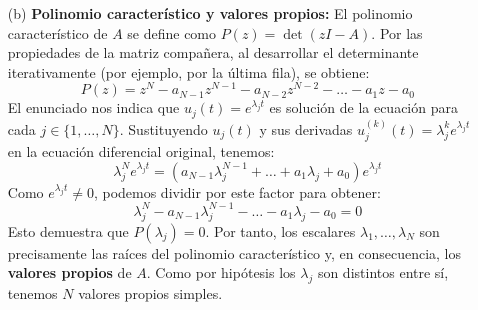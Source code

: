 {\begin{enumerate}
        $$U'(t) = \begin{pmatrix} 
            0 & 1 & 0 & \dots & 0 \\ 
            0 & 0 & 1 & \dots & 0 \\ 
            \vdots & \vdots & \vdots & \ddots & \vdots \\ 
            0 & 0 & 0 & \dots & 1 \\ 
            a_0 & a_1 & a_2 & \dots & a_{N-1} 
        \end{pmatrix} \begin{pmatrix} u(t) \\ u'(t) \\ \vdots \\ u^{(N-2)}(t) \\ u^{(N-1)}(t) \end{pmatrix}$$
        La matriz $A \in \mathcal{M}_N(\mathbb{C})$ obtenida recibe el nombre de \textit{matriz compañera} (o matriz acompañante) asociada a la ecuación diferencial.

        \item[(b)] \textbf{Polinomio característico y valores propios:}
        El polinomio característico de $A$ se define como $P(z) = \det(zI - A)$. Por las propiedades de la matriz compañera, al desarrollar el determinante iterativamente (por ejemplo, por la última fila), se obtiene:
        $$P(z) = z^N - a_{N-1}z^{N-1} - a_{N-2}z^{N-2} - \dots - a_1 z - a_0$$
        El enunciado nos indica que $u_j(t) = e^{\lambda_j t}$ es solución de la ecuación para cada $j \in \{1, \dots, N\}$. Sustituyendo $u_j(t)$ y sus derivadas $u_j^{(k)}(t) = \lambda_j^k e^{\lambda_j t}$ en la ecuación diferencial original, tenemos:
        $$\lambda_j^N e^{\lambda_j t} = \left( a_{N-1}\lambda_j^{N-1} + \dots + a_1 \lambda_j + a_0 \right) e^{\lambda_j t}$$
        Como $e^{\lambda_j t} \neq 0$, podemos dividir por este factor para obtener:
        $$\lambda_j^N - a_{N-1}\lambda_j^{N-1} - \dots - a_1 \lambda_j - a_0 = 0$$
        Esto demuestra que $P(\lambda_j) = 0$. Por tanto, los escalares $\lambda_1, \dots, \lambda_N$ son precisamente las raíces del polinomio característico y, en consecuencia, los \textbf{valores propios} de $A$. Como por hipótesis los $\lambda_j$ son distintos entre sí, tenemos $N$ valores propios simples.


\end{enumerate}}
